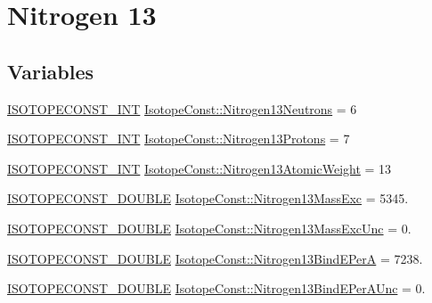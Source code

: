 \hypertarget{group___isotope_const-_nitrogen-_n13}{}\section{Nitrogen 13}
\label{group___isotope_const-_nitrogen-_n13}
\subsection*{Variables}
\begin{DoxyCompactItemize}
\item 
\mbox{\hyperlink{group___isotope_const-_macros_ga5f18360b3e99483a35c32d789e62621c}{I\+S\+O\+T\+O\+P\+E\+C\+O\+N\+S\+T\+\_\+\+I\+NT}} \mbox{\hyperlink{group___isotope_const-_nitrogen-_n13_ga8ccf15f7b366001fcc4a983f66f487c4}{Isotope\+Const\+::\+Nitrogen13\+Neutrons}} = 6
\item 
\mbox{\hyperlink{group___isotope_const-_macros_ga5f18360b3e99483a35c32d789e62621c}{I\+S\+O\+T\+O\+P\+E\+C\+O\+N\+S\+T\+\_\+\+I\+NT}} \mbox{\hyperlink{group___isotope_const-_nitrogen-_n13_ga9da073647320f15f982dbc55caa6a0b8}{Isotope\+Const\+::\+Nitrogen13\+Protons}} = 7
\item 
\mbox{\hyperlink{group___isotope_const-_macros_ga5f18360b3e99483a35c32d789e62621c}{I\+S\+O\+T\+O\+P\+E\+C\+O\+N\+S\+T\+\_\+\+I\+NT}} \mbox{\hyperlink{group___isotope_const-_nitrogen-_n13_ga1a08065767452273a557c2c4d35e5762}{Isotope\+Const\+::\+Nitrogen13\+Atomic\+Weight}} = 13
\item 
\mbox{\hyperlink{group___isotope_const-_macros_ga8f45a7272ce02c0b4c65c44636ed719a}{I\+S\+O\+T\+O\+P\+E\+C\+O\+N\+S\+T\+\_\+\+D\+O\+U\+B\+LE}} \mbox{\hyperlink{group___isotope_const-_nitrogen-_n13_ga0d0e3ad2d8a4ab34fd9c89937800bfae}{Isotope\+Const\+::\+Nitrogen13\+Mass\+Exc}} = 5345.
\item 
\mbox{\hyperlink{group___isotope_const-_macros_ga8f45a7272ce02c0b4c65c44636ed719a}{I\+S\+O\+T\+O\+P\+E\+C\+O\+N\+S\+T\+\_\+\+D\+O\+U\+B\+LE}} \mbox{\hyperlink{group___isotope_const-_nitrogen-_n13_ga4d27c9a64afbc433996a0c14f9108e09}{Isotope\+Const\+::\+Nitrogen13\+Mass\+Exc\+Unc}} = 0.
\item 
\mbox{\hyperlink{group___isotope_const-_macros_ga8f45a7272ce02c0b4c65c44636ed719a}{I\+S\+O\+T\+O\+P\+E\+C\+O\+N\+S\+T\+\_\+\+D\+O\+U\+B\+LE}} \mbox{\hyperlink{group___isotope_const-_nitrogen-_n13_ga25fe3f60385e543f694b1e5fdf88c04f}{Isotope\+Const\+::\+Nitrogen13\+Bind\+E\+PerA}} = 7238.
\item 
\mbox{\hyperlink{group___isotope_const-_macros_ga8f45a7272ce02c0b4c65c44636ed719a}{I\+S\+O\+T\+O\+P\+E\+C\+O\+N\+S\+T\+\_\+\+D\+O\+U\+B\+LE}} \mbox{\hyperlink{group___isotope_const-_nitrogen-_n13_ga4abd1fc429c2b243a68b8fb09ef8a1d2}{Isotope\+Const\+::\+Nitrogen13\+Bind\+E\+Per\+A\+Unc}} = 0.

\end{DoxyCompactItemize}
